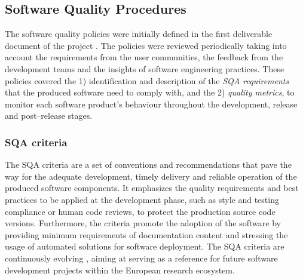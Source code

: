 \documentclass[journal]{IEEEtran}
\begin{document}
\subsection{Software Quality Procedures}
\label{subsec:sqa}

The software quality policies were initially defined in the first deliverable document of the
project \cite{indigo-d31}. The policies were reviewed periodically taking into account the requirements
from the user communities, the feedback from the development teams and the insights of software
engineering practices. These policies covered the 1) identification
and description of the \emph{SQA requirements} that the produced software need
to comply with, and the 2) \emph{quality metrics}, to monitor each software product's
behaviour throughout the development, release and post--release stages.

\subsubsection{SQA criteria}

The SQA criteria are a set of conventions and recommendations that pave the way for
the adequate development, timely delivery and reliable operation of the produced software components.
It emphasizes the quality requirements and best practices to be applied at the
development phase, such as style and testing compliance or human code reviews, to protect the
production source code versions. Furthermore, the criteria promote the adoption of the software
by providing minimum requirements of documentation content and stressing the usage of automated
solutions for software deployment. The SQA criteria are continuously evolving \cite{sqa-baseline}, aiming at serving
as a reference for future software development projects within the European research ecosystem.
\end{document}
